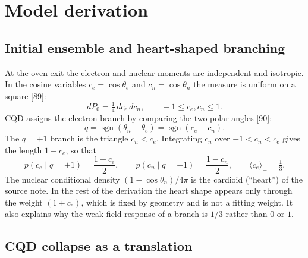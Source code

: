 \documentclass[11pt,a4paper]{article}
\begin{document}

\section{Model derivation}

\subsection{Initial ensemble and heart-shaped branching}

At the oven exit the electron and nuclear moments are independent and isotropic. In the cosine
variables $c_e=\cos\theta_e$ and $c_n=\cos\theta_n$ the measure is uniform on a square [89]:
\begin{equation}
dP_0=\tfrac14\,dc_e\,dc_n,\qquad -1\le c_e,c_n\le 1.
\end{equation}
CQD assigns the electron branch by comparing the two polar angles [90]:
\begin{equation}
q=\operatorname{sgn}(\theta_n-\theta_e)=\operatorname{sgn}(c_e-c_n).
\end{equation}
The $q=+1$ branch is the triangle $c_n<c_e$. Integrating $c_n$ over $-1<c_n<c_e$ gives the length
$1+c_e$, so that
\begin{equation}
p(c_e\mid q{=}+1)=\frac{1+c_e}{2},\qquad p(c_n\mid q{=}+1)=\frac{1-c_n}{2},\qquad
\langle c_e\rangle_+=\tfrac13 .
\end{equation}
The nuclear conditional density $(1-\cos\theta_n)/4\pi$ is the cardioid (``heart'') of the source
note. In the rest of the derivation the heart shape appears only through the weight $(1+c_e)$, which
is fixed by geometry and is not a fitting weight. It also explains why the weak-field response of a
branch is $1/3$ rather than $0$ or $1$.

\subsection{CQD collapse as a translation}
\end{document}
